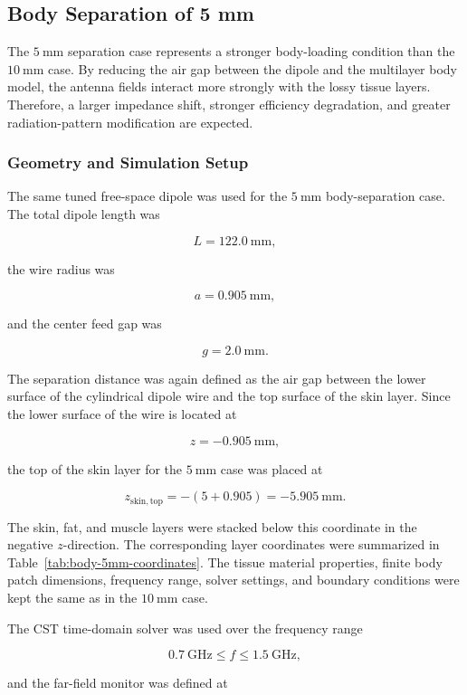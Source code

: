 \subsection{Body Separation of 5 mm}

The \(5~\mathrm{mm}\) separation case represents a stronger body-loading condition than the \(10~\mathrm{mm}\) case. By reducing the air gap between the dipole and the multilayer body model, the antenna fields interact more strongly with the lossy tissue layers. Therefore, a larger impedance shift, stronger efficiency degradation, and greater radiation-pattern modification are expected.

\subsubsection{Geometry and Simulation Setup}

The same tuned free-space dipole was used for the \(5~\mathrm{mm}\) body-separation case. The total dipole length was

\[
L = 122.0~\mathrm{mm},
\]

the wire radius was

\[
a = 0.905~\mathrm{mm},
\]

and the center feed gap was

\[
g = 2.0~\mathrm{mm}.
\]

The separation distance was again defined as the air gap between the lower surface of the cylindrical dipole wire and the top surface of the skin layer. Since the lower surface of the wire is located at

\[
z=-0.905~\mathrm{mm},
\]

the top of the skin layer for the \(5~\mathrm{mm}\) case was placed at

\[
z_{\mathrm{skin,top}}=-(5+0.905)
=
-5.905~\mathrm{mm}.
\]

The skin, fat, and muscle layers were stacked below this coordinate in the negative \(z\)-direction. The corresponding layer coordinates were summarized in Table~\ref{tab:body-5mm-coordinates}. The tissue material properties, finite body patch dimensions, frequency range, solver settings, and boundary conditions were kept the same as in the \(10~\mathrm{mm}\) case.

The CST time-domain solver was used over the frequency range

\[
0.7~\mathrm{GHz} \leq f \leq 1.5~\mathrm{GHz},
\]

and the far-field monitor was defined at


